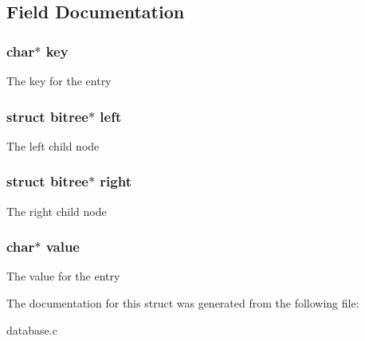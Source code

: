 \subsection{Field Documentation}
\hypertarget{structbitree_a5892a9181e6a332f84d27aecd41dcd12}{
\subsubsection[{key}]{\setlength{\rightskip}{0pt plus 5cm}char$\ast$ key}}\label{structbitree_a5892a9181e6a332f84d27aecd41dcd12}
The key for the entry \hypertarget{structbitree_a18d65ac734ef7c9a47acebcc1bd95a99}{
\subsubsection[{left}]{\setlength{\rightskip}{0pt plus 5cm}struct {\bf bitree}$\ast$ left}}\label{structbitree_a18d65ac734ef7c9a47acebcc1bd95a99}
The left child node \hypertarget{structbitree_a3874405da5a2a805074d4487d3c67d45}{
\subsubsection[{right}]{\setlength{\rightskip}{0pt plus 5cm}struct {\bf bitree}$\ast$ right}}\label{structbitree_a3874405da5a2a805074d4487d3c67d45}
The right child node \hypertarget{structbitree_a4e9aec275e566b978a3ccb4e043d8c61}{
\subsubsection[{value}]{\setlength{\rightskip}{0pt plus 5cm}char$\ast$ value}}\label{structbitree_a4e9aec275e566b978a3ccb4e043d8c61}
The value for the entry 

The documentation for this struct was generated from the following file\-:\begin{DoxyCompactItemize}
\item 
database.\-c\end{DoxyCompactItemize}
